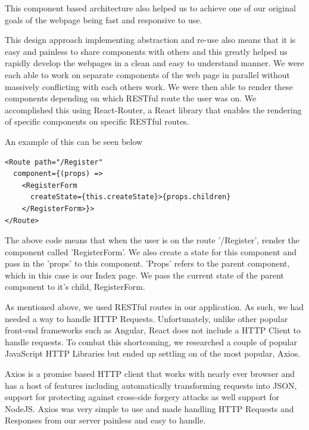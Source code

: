 This component based architecture also helped us to achieve one of our original goals of the webpage being fast and responsive to use.

This design approach implementing abstraction and re-use also means that it is easy and painless to share components with others and this greatly helped us rapidly develop the webpages in a clean and easy to understand manner. We were each able to work on separate components of the web page in parallel without massively conflicting with each others work.
We were then able to render these components depending on which RESTful route the user was on. We accomplished this using React-Router, a React library that enables the rendering of specific components on specific RESTful routes.

An example of this can be seen below

\begin{verbatim}
<Route path="/Register" 
  component={(props) => 
    <RegisterForm 
      createState={this.createState}>{props.children}
    </RegisterForm>}>
</Route>
\end{verbatim}

The above code means that when the user is on the route '/Register', render the component called 'RegisterForm'. We also create a state for this component and pass in the 'props' to this component.
'Props' refers to the parent component, which in this case is our Index page. We pass the current state of the parent component to it's child, RegisterForm.

As mentioned above, we used RESTful routes in our application. As such, we had needed a way to handle HTTP Requests. Unfortunately, unlike other popular front-end frameworks such as Angular, React does not include a HTTP Client to handle requests.
To combat this shortcoming, we researched a couple of popular JavaScript HTTP Libraries but ended up settling on of the most popular, Axios. 

Axios is a promise based HTTP client that works with nearly ever browser and has a host of features including automatically transforming requests into JSON, support for protecting against cross-side forgery attacks as well support for NodeJS. Axios was very simple to use and made handling HTTP Requests and Responses from our server painless and easy to handle.

\newpage

